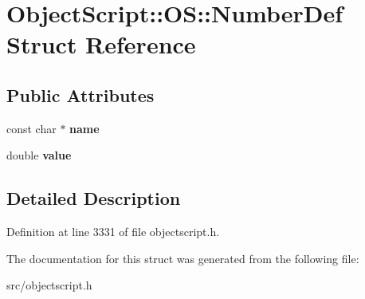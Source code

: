 \hypertarget{struct_object_script_1_1_o_s_1_1_number_def}{}\section{Object\+Script\+:\+:OS\+:\+:Number\+Def Struct Reference}
\label{struct_object_script_1_1_o_s_1_1_number_def}
\subsection*{Public Attributes}
\begin{DoxyCompactItemize}
\item 
const char $\ast$ {\bfseries name}\hypertarget{struct_object_script_1_1_o_s_1_1_number_def_a87240e6ce1a1fe1a8a7ec0170faa42b0}{}\label{struct_object_script_1_1_o_s_1_1_number_def_a87240e6ce1a1fe1a8a7ec0170faa42b0}

\item 
double {\bfseries value}\hypertarget{struct_object_script_1_1_o_s_1_1_number_def_acb90f1038e021a040cfe5e29142dde03}{}\label{struct_object_script_1_1_o_s_1_1_number_def_acb90f1038e021a040cfe5e29142dde03}

\end{DoxyCompactItemize}


\subsection{Detailed Description}


Definition at line 3331 of file objectscript.\+h.



The documentation for this struct was generated from the following file\+:\begin{DoxyCompactItemize}
\item 
src/objectscript.\+h\end{DoxyCompactItemize}
